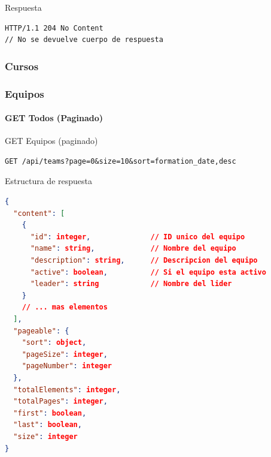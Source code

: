 \documentclass[11pt,a4paper]{article}
\begin{document}
\begin{center}
	\begin{minipage}{\textwidth}
		\begin{codebox}{Respuesta}
			\begin{lstlisting}[language=HTTP]
HTTP/1.1 204 No Content
// No se devuelve cuerpo de respuesta
\end{lstlisting}
		\end{codebox}
	\end{minipage}
\end{center}



\subsubsection{Cursos}


\subsubsection{Equipos}

\paragraph{GET Todos (Paginado)}

\begin{center}
	\begin{minipage}{\textwidth}
		\begin{codebox}{GET Equipos (paginado)}
			\begin{lstlisting}[language=HTTP]
GET /api/teams?page=0&size=10&sort=formation_date,desc
\end{lstlisting}
		\end{codebox}
	\end{minipage}
\end{center}

\begin{center}
	\begin{minipage}{\textwidth}
		\begin{codebox}{Estructura de respuesta}
			\begin{lstlisting}[language=json]
{
  "content": [
    {
      "id": integer,              // ID unico del equipo
      "name": string,             // Nombre del equipo
      "description": string,      // Descripcion del equipo
      "active": boolean,          // Si el equipo esta activo
      "leader": string            // Nombre del lider
    }
    // ... mas elementos
  ],
  "pageable": {
    "sort": object,
    "pageSize": integer,
    "pageNumber": integer
  },
  "totalElements": integer,
  "totalPages": integer,
  "first": boolean,
  "last": boolean,
  "size": integer
}
\end{lstlisting}
		\end{codebox}
	\end{minipage}
\end{center}
\end{document}
